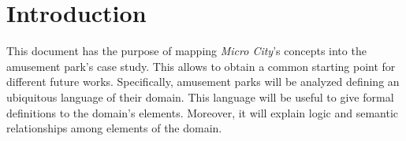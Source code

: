 \section*{Introduction}
\label{sec:introduction}

This document has the purpose of mapping \textit{Micro City}'s concepts into the amusement park's case study. This allows to obtain a common starting point for different future works. Specifically, amusement parks will be analyzed defining an ubiquitous language of their domain. This language will be useful to give formal definitions to the domain's elements. Moreover, it will explain logic and semantic relationships among elements of the domain.

